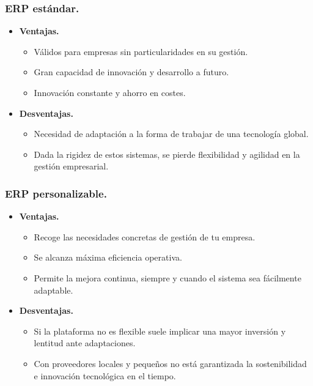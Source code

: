 \documentclass[
]{article}
\providecommand{\tightlist}{%
  \setlength{\itemsep}{0pt}\setlength{\parskip}{0pt}}
\begin{document}
\hypertarget{erp-estuxe1ndar.}{%
\subsubsection{ERP estándar.}\label{erp-estuxe1ndar.}}

\begin{itemize}
\item
  \textbf{Ventajas.}

  \begin{itemize}
  \tightlist
  \item
    Válidos para empresas sin particularidades en su gestión.
  \item
    Gran capacidad de innovación y desarrollo a futuro.
  \item
    Innovación constante y ahorro en costes.
  \end{itemize}
\item
  \textbf{Desventajas.}

  \begin{itemize}
  \tightlist
  \item
    Necesidad de adaptación a la forma de trabajar de una tecnología
    global.
  \item
    Dada la rigidez de estos sistemas, se pierde flexibilidad y agilidad
    en la gestión empresarial.
  \end{itemize}
\end{itemize}

\hypertarget{erp-personalizable.}{%
\subsubsection{ERP personalizable.}\label{erp-personalizable.}}

\begin{itemize}
\item
  \textbf{Ventajas.}

  \begin{itemize}
  \tightlist
  \item
    Recoge las necesidades concretas de gestión de tu empresa.
  \item
    Se alcanza máxima eficiencia operativa.
  \item
    Permite la mejora continua, siempre y cuando el sistema sea
    fácilmente adaptable.
  \end{itemize}
\item
  \textbf{Desventajas.}

  \begin{itemize}
  \tightlist
  \item
    Si la plataforma no es flexible suele implicar una mayor inversión y
    lentitud ante adaptaciones.
  \item
    Con proveedores locales y pequeños no está garantizada la
    sostenibilidad e innovación tecnológica en el tiempo.
  \end{itemize}
\end{itemize}
\end{document}
